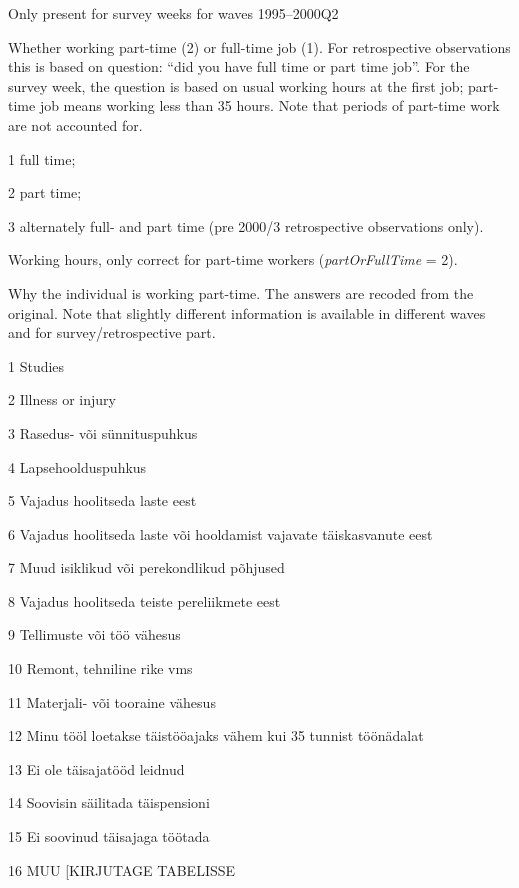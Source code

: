 \documentclass[a4paper]{article}
\begin{document}
\begin{description}
  Only present for survey weeks for waves 1995--2000Q2
\item[partOrFullTime] Whether working part-time (2) or full-time job
  (1).  For retrospective observations this is based on question:
  ``did you have full time or part time job''.  For the survey week,
  the question is based on usual working hours at the first job;
  part-time job means working less than 35 hours.  Note that periods
  of part-time work are not accounted for.
  \begin{inparaitem}
  \item[1] full time;
  \item[2] part time;
  \item[3] alternately full- and part time (pre 2000/3 retrospective
    observations only).
  \end{inparaitem}
\item[partTimeHours] Working hours, only correct for part-time workers
  (\emph{partOrFullTime} = 2).
\item[partTimeReason] Why the individual is working part-time.  The
  answers are recoded from the original.  Note that slightly different
  information is available in different waves and for
  survey/retrospective part.
  \begin{inparaenum}
  \item[1] Studies
  \item[2] Illness or injury
  \item[3] Rasedus- või sünnituspuhkus
  \item[4] Lapsehoolduspuhkus
  \item[5] Vajadus hoolitseda laste eest
  \item[6] Vajadus hoolitseda laste või hooldamist vajavate täiskasvanute eest
  \item[7] Muud isiklikud või perekondlikud põhjused
  \item[8] Vajadus hoolitseda teiste pereliikmete eest
  \item[9] Tellimuste või töö vähesus
  \item[10] Remont, tehniline rike vms
  \item[11] Materjali- või tooraine vähesus
  \item[12] Minu tööl loetakse täistööajaks vähem kui 35 tunnist töönädalat
  \item[13] Ei ole täisajatööd leidnud
  \item[14] Soovisin säilitada täispensioni
  \item[15] Ei soovinud täisajaga töötada
  \item[16] MUU [KIRJUTAGE TABELISSE
  \end{inparaenum}
\end{description}
\end{document}
